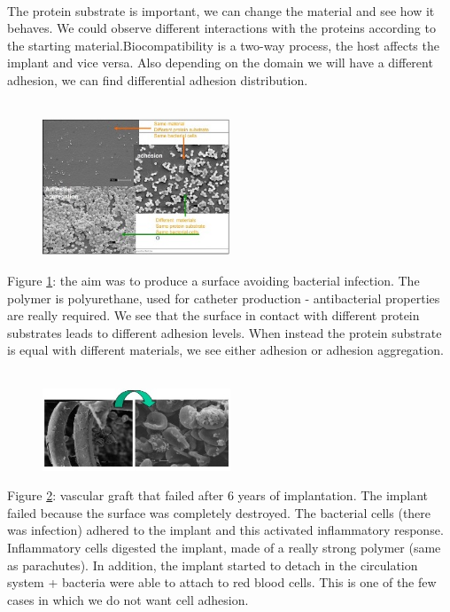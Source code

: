 \\
\noindent
The protein substrate is important, we can change the material and see how it behaves.
We could observe different interactions with the proteins according to the starting material.Biocompatibility is a two-way process, the host affects the implant and vice versa. Also depending on the domain we will have a different adhesion, we can find differential adhesion distribution.
\\
\\
\noindent
\begin{figure}[h]
\centering
\includegraphics[width=0.5\textwidth]{polyu}
\caption{\label{fig:polyu}}
\end{figure}
Figure \ref{fig:polyu}: the aim was to produce a surface avoiding bacterial infection. The polymer is polyurethane, used for catheter production - antibacterial properties are really required.
We see that the surface in contact with different protein substrates leads to different adhesion levels. When instead the protein substrate is equal with different materials, we see either adhesion or adhesion aggregation.
\\
\\
\noindent
\begin{figure}[h]
\includegraphics[width=0.5\textwidth]{vascular}
\centering
\caption{\label{fig:vascular}}
\end{figure}
Figure \ref{fig:vascular}: vascular graft that failed after 6 years of implantation. The implant failed because the surface was completely destroyed. The bacterial cells (there was infection) adhered to the implant and this activated inflammatory response. Inflammatory cells digested the implant, made of a really strong polymer (same as parachutes). In addition, the implant started to detach in the circulation system + bacteria were able to attach to red blood cells. This is one of the few cases in which we do not want cell adhesion.


